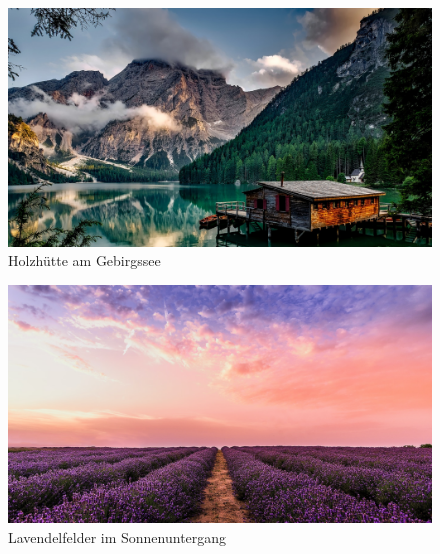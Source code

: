 \begin{showcase}
\begin{center}
\begin{subfigure}{0.49\columnwidth}
            \includegraphics[width=\linewidth]{assets/images/bilder/pexels-pixabay-147411.jpg}
            \caption{Holzhütte am Gebirgssee}
        \end{subfigure}
        \hfill
        \begin{subfigure}{0.49\columnwidth}
            \includegraphics[width=\linewidth]{assets/images/bilder/pexels-david-bartus-1166209.jpg}
            \caption{Lavendelfelder im Sonnenuntergang}
        \end{subfigure}
    \end{center}
\end{showcase}

